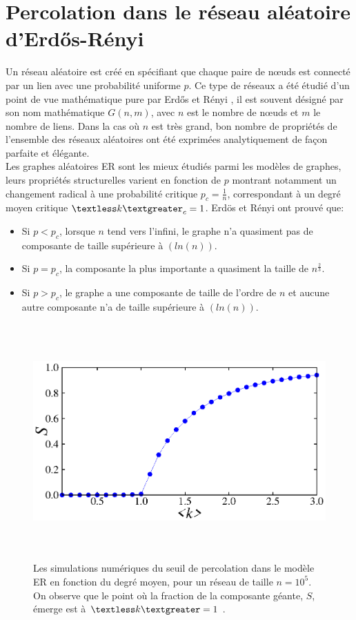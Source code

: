  \section{Percolation dans le réseau aléatoire d'Erd\H{o}s-Rényi}
 
 Un réseau aléatoire est créé en spécifiant que chaque paire de nœuds est connecté par un lien avec une probabilité uniforme $p$. Ce type de réseaux a été étudié d'un point de vue mathématique pure par Erd\H{o}s et Rényi \cite{Erdos-Renyi1959,Erdos-Renyi1960,Erdos-Renyi1961}, il est souvent désigné par son nom mathématique $G(n,m)$, avec $n$ est le nombre de nœuds et $m$ le nombre de liens. 
 Dans la cas où $n$ est très grand, bon nombre de propriétés de l'ensemble des réseaux aléatoires ont été exprimées analytiquement de façon parfaite et élégante.\\
 Les graphes aléatoires ER sont les mieux étudiés parmi les modèles de graphes, leurs propriétés structurelles varient en fonction de $p$ montrant notamment un changement radical à une probabilité critique $p_c=\frac{1}{n}$,
 correspondant à un degré moyen critique $\textless k \textgreater_c=1$. Erdös et Rényi ont prouvé que:\\
 \begin{itemize}
 	\item Si $p <p_c$, lorsque $n$ tend vers l'infini, le graphe n'a quasiment pas de composante de taille  
 	supérieure à $(ln(n))$.
 	\item Si $p=p_c$, la composante la plus importante a quasiment la taille de $n^{\frac{2}{3}}$.
 	\item Si $p> p_c$, le graphe a une composante de taille de l'ordre de $n$ et aucune autre composante n'a de taille supérieure à $(ln(n))$.
 \end{itemize}
 \begin{figure}[h!]
 	\centering
 	\includegraphics[width=12cm,height=9cm]{./figures/fig-ER-CG}
 	\caption{Les simulations numériques du seuil de percolation dans le modèle ER en fonction du degré moyen, pour un réseau de taille $n=10^5$. On observe que le point où la fraction de la composante géante, $S$, émerge est à $\textless k\textgreater=1$ .}
 	
 	\label{percolation-graph}
 \end{figure}
 
